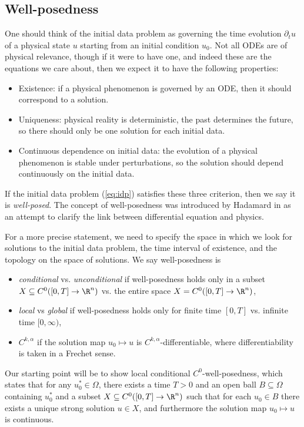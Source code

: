 \subsection{Well-posedness}

One should think of the initial data problem as governing the time evolution $\partial_t u$ of a physical state $u$ starting from an initial condition $u_0$. Not all ODEs are of physical relevance, though if it were to have one, and indeed these are the equations we care about, then we expect it to have the following properties:
	\begin{itemize}
		\item Existence: if a physical phenomenon is governed by an ODE, then it should correspond to a solution. 
		
		\item Uniqueness: physical reality is deterministic, the past determines the future, so there should only be one solution for each initial data. 
		
		\item Continuous dependence on initial data: the evolution of a physical phenomenon is stable under perturbations, so the solution should depend continuously on the initial data. 
	\end{itemize}
If the initial data problem (\ref{eq:idp}) satisfies these three criterion, then we say it is \emph{well-posed}. The concept of well-posedness was introduced by Hadamard in \cite{hadamard} as an attempt to clarify the link between differential equation and physics. 

For a more precise statement, we need to specify the space in which we look for solutions to the initial data problem, the time interval of existence, and the topology on the space of solutions. We say well-posedness is
	\begin{itemize}
		\item \emph{conditional} vs. \emph{unconditional} if well-posedness holds only in a subset $X \subseteq C^0 ([0, T] \to \R^n)$ vs. the entire space $X = C^0 ([0, T] \to \R^n)$, 
		
		\item \emph{local} vs \emph{global} if well-posedness holds only for finite time $[0, T]$ vs. infinite time $[0, \infty)$, 
		
		\item $C^{k, \alpha}$ if the solution map $u_0 \mapsto u$ is $C^{k, \alpha}$-differentiable, where differentiability is taken in a Frechet sense. 
	\end{itemize}
Our starting point will be to show local conditional $C^0$-well-posedness, which states that	for any $u_0^* \in \Omega$, there exists a time $T > 0$ and an open ball $B \subseteq \Omega$ containing $u_0^*$ and a subset $X \subseteq C^0([0, T] \to \R^n)$ such that for each $u_0 \in B$ there exists a unique strong solution $u \in X$, and furthermore the solution map $u_0 \mapsto u$ is continuous. 
